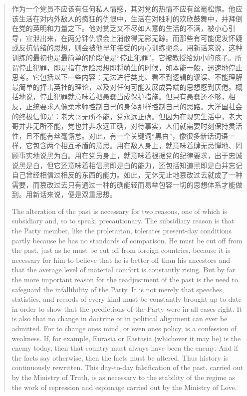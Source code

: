\begin{paracol}{2}
\begin{quotation}
作为一个党员不应该有任何私人情感，其对党的热情不应有丝毫松懈。他应该生活在对内外敌人的疯狂的仇恨中，生活在对胜利的欢欣鼓舞中，并拜倒在党的英明和力量之下。他对贫乏又不尽如人意的生活的不满，被小心引导，宣泄出来，在两分钟仇恨会上消散得无影无踪。而那些有可能促发怀疑或反抗情绪的思想，则会被他早年接受的内心训练扼杀。用新话来说，这种训练的最初也是最简单的阶段便是``停止犯罪''，它被教授给幼小的孩子。所谓停止犯罪，即是指在危险思想即将萌生的时候，如本能一般，迅速地停止思考。它包括以下一些内容：无法进行类比、看不到逻辑的谬误、不能理解最简单的抨击英社的理论，以及对任何可能发展成异端的思想感到厌倦。概括地说，停止犯罪就意味着把愚蠢当成保护措施。但只有愚蠢还不够，相反，正统要求人像柔术师控制自己的身体那样控制自己的思路。大洋国社会的终极信仰是：老大哥无所不能，党永远正确。但因为在现实生活中，老大哥并非无所不能，党也并非永远正确，对待事实，人们就需要时刻保持灵活性，且不能有丝毫懈怠。对此，有一个关键词``黑白''，像很多新话词语一样，它包含两个相互矛盾的意思。用在敌人身上，就意味着肆无忌惮地、罔顾事实地说黑为白。用在党员身上，就意味着根据党的纪律要求，出于忠诚说黑是白，但它还意味着相信黑即是白的能力，还包括知道黑即是白并忘记自己曾经相信过相反的东西的能力。如此，无休无止地篡改过去就成了一种需要，而篡改过去只有通过一种的确能轻而易举包容一切的思想体系才能做到。用新话来说，便是双重思想。

\switchcolumn*

The alteration of the past is necessary for two reasons, one of which is
subsidiary and, so to speak, precautionary. The subsidiary reason is
that the Party member, like the proletarian, tolerates present-day
conditions partly because he has no standards of comparison. He must be
cut off from the past, just as he must be cut off from foreign
countries, because it is necessary for him to believe that he is better
off than his ancestors and that the average level of material comfort is
constantly rising. But by far the more important reason for the
readjustment of the past is the need to safeguard the infallibility of
the Party. It is not merely that speeches, statistics, and records of
every kind must be constantly brought up to date in order to show that
the predictions of the Party were in all cases right. It is also that no
change in doctrine or in political alignment can ever be admitted. For
to change one\textquotesingle s mind, or even one\textquotesingle s
policy, is a confession of weakness. If, for example, Eurasia or
Eastasia (whichever it may be) is the enemy today, then that country
must always have been the enemy. And if the facts say otherwise, then
the facts must be altered. Thus history is continuously rewritten. This
day-to-day falsification of the past, carried out by the Ministry of
Truth, is as necessary to the stability of the regime as the work of
repression and espionage carried out by the Ministry of Love.


\end{quotation}
\end{paracol}
